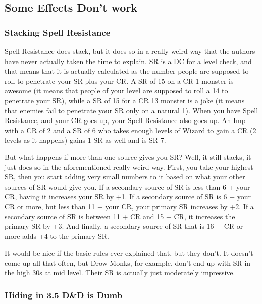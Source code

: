 
\subsection{Some Effects Don't work}

\subsubsection{Stacking Spell Resistance}

Spell Resistance does stack, but it does so in a really weird way that the authors have never actually taken the time to explain. SR is a DC for a level check, and that means that it is actually calculated as the number people are supposed to roll to penetrate your SR plus your CR. A SR of 15 on a CR 1 monster is awesome (it means that people of your level are supposed to roll a 14 to penetrate your SR), while a SR of 15 for a CR 13 monster is a joke (it means that enemies fail to penetrate your SR only on a natural 1). When you have Spell Resistance, and your CR goes up, your Spell Resistance also goes up. An Imp with a CR of 2 and a SR of 6 who takes enough levels of Wizard to gain a CR (2 levels as it happens) gains 1 SR as well and is SR 7.

But what happens if more than one source gives you SR? Well, it still stacks, it just does so in the aforementioned really weird way. First, you take your highest SR, then you start adding very small numbers to it based on what your other sources of SR would give you. If a secondary source of SR is less than 6 + your CR, having it increases your SR by +1. If a secondary source of SR is 6 + your CR or more, but less than 11 + your CR, your primary SR increases by +2. If a secondary source of SR is between 11 + CR and 15 + CR, it increases the primary SR by +3. And finally, a secondary source of SR that is 16 + CR or more adds +4 to the primary SR.

It would be nice if the basic rules ever explained that, but they don't. It doesn't come up all that often, but Drow Monks, for example, don't end up with SR in the high 30s at mid level. Their SR is actually just moderately impressive.

\subsubsection{Hiding in 3.5 D\&D is Dumb}

